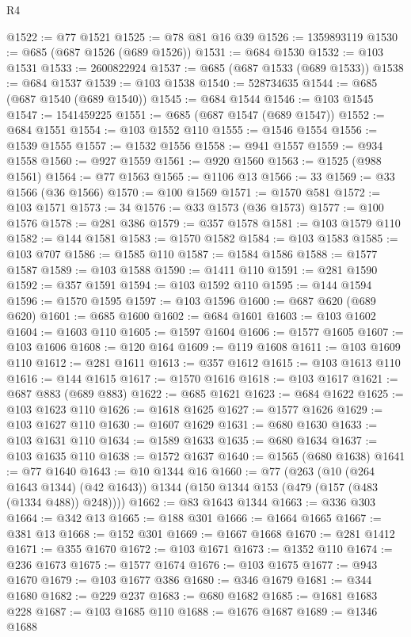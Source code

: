\begin{lexlean}{R4}
\begin{coremodule}
@1522 := @77 @1521
@1525 := @78 @81 @16 @39
@1526 := 1359893119
@1530 := @685 (@687 @1526 (@689 @1526))
@1531 := @684 @1530
@1532 := @103 @1531
@1533 := 2600822924
@1537 := @685 (@687 @1533 (@689 @1533))
@1538 := @684 @1537
@1539 := @103 @1538
@1540 := 528734635
@1544 := @685 (@687 @1540 (@689 @1540))
@1545 := @684 @1544
@1546 := @103 @1545
@1547 := 1541459225
@1551 := @685 (@687 @1547 (@689 @1547))
@1552 := @684 @1551
@1554 := @103 @1552 @110
@1555 := @1546 @1554
@1556 := @1539 @1555
@1557 := @1532 @1556
@1558 := @941 @1557
@1559 := @934 @1558
@1560 := @927 @1559
@1561 := @920 @1560
@1563 := @1525 (@988 @1561)
@1564 := @77 @1563
@1565 := @1106 @13
@1566 := 33
@1569 := @33 @1566 (@36 @1566)
@1570 := @100 @1569
@1571 := @1570 @581
@1572 := @103 @1571
@1573 := 34
@1576 := @33 @1573 (@36 @1573)
@1577 := @100 @1576
@1578 := @281 @386
@1579 := @357 @1578
@1581 := @103 @1579 @110
@1582 := @144 @1581
@1583 := @1570 @1582
@1584 := @103 @1583
@1585 := @103 @707
@1586 := @1585 @110
@1587 := @1584 @1586
@1588 := @1577 @1587
@1589 := @103 @1588
@1590 := @1411 @110
@1591 := @281 @1590
@1592 := @357 @1591
@1594 := @103 @1592 @110
@1595 := @144 @1594
@1596 := @1570 @1595
@1597 := @103 @1596
@1600 := @687 @620 (@689 @620)
@1601 := @685 @1600
@1602 := @684 @1601
@1603 := @103 @1602
@1604 := @1603 @110
@1605 := @1597 @1604
@1606 := @1577 @1605
@1607 := @103 @1606
@1608 := @120 @164
@1609 := @119 @1608
@1611 := @103 @1609 @110
@1612 := @281 @1611
@1613 := @357 @1612
@1615 := @103 @1613 @110
@1616 := @144 @1615
@1617 := @1570 @1616
@1618 := @103 @1617
@1621 := @687 @883 (@689 @883)
@1622 := @685 @1621
@1623 := @684 @1622
@1625 := @103 @1623 @110
@1626 := @1618 @1625
@1627 := @1577 @1626
@1629 := @103 @1627 @110
@1630 := @1607 @1629
@1631 := @680 @1630
@1633 := @103 @1631 @110
@1634 := @1589 @1633
@1635 := @680 @1634
@1637 := @103 @1635 @110
@1638 := @1572 @1637
@1640 := @1565 (@680 @1638)
@1641 := @77 @1640
@1643 := @10 @1344 @16
@1660 := @77
    (@263
      (@10 (@264 @1643 @1344) (@42 @1643))
      @1344
      (@150 @1344 @153 (@479 (@157 (@483 (@1334 @488)) @248))))
@1662 := @83 @1643 @1344
@1663 := @336 @303
@1664 := @342 @13
@1665 := @188 @301
@1666 := @1664 @1665
@1667 := @381 @13
@1668 := @152 @301
@1669 := @1667 @1668
@1670 := @281 @1412
@1671 := @355 @1670
@1672 := @103 @1671
@1673 := @1352 @110
@1674 := @236 @1673
@1675 := @1577 @1674
@1676 := @103 @1675
@1677 := @943 @1670
@1679 := @103 @1677 @386
@1680 := @346 @1679
@1681 := @344 @1680
@1682 := @229 @237
@1683 := @680 @1682
@1685 := @1681 @1683 @228
@1687 := @103 @1685 @110
@1688 := @1676 @1687
@1689 := @1346 @1688

\end{coremodule}
\end{lexlean}
